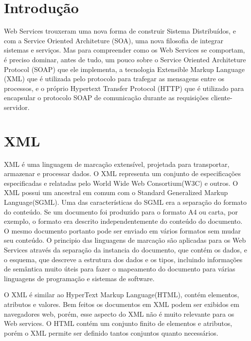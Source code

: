 \documentclass{acm_proc_article-sp}
\begin{document}



\section{Introdução}
		Web Services trouxeram uma nova forma de construir Sistema Distribuídos, e com a Service Oriented Architeture (SOA), uma nova filosofia de integrar sistemas e serviços. Mas para compreender como os Web Services se comportam, é preciso dominar, antes de tudo, um pouco sobre o Service Oriented Architeture Protocol (SOAP) que ele implementa, a tecnologia Extensible Markup Language (XML) que é utilizada pelo protocolo para trafegar as mensagens entre os processos, e o próprio Hypertext Transfer Protocol (HTTP) que é utilizado para encapsular o protocolo SOAP de comunicação durante as requisições cliente-servidor.
		
		
\section{XML}
		XML é uma linguagem de marcação extensível, projetada para transportar, armazenar e processar dados. O XML representa um conjunto de especificações especificadas e relatadas pelo World Wide Web Consortium(W3C) e outros. O XML possui um ancestral em comum com o Standard Generalized Markup Language(SGML). Uma das características do SGML era a separação do formato do conteúdo. Se um documento foi produzido para o formato A4 ou carta, por exemplo, o formato era descrito independentemente do conteúdo do documento. O mesmo documento portanto pode ser enviado em vários formatos sem mudar seu conteúdo. O principio das linguagens de marcação são aplicadas para os Web Services através da separação da instancia do documento, que contém os dados, e o esquema, que descreve a estrutura dos dados e os tipos, incluindo informações de semântica muito úteis para fazer o mapeamento do documento para várias linguagens de programação e sistemas de software.
		
		O XML é similar ao HyperText Markup Language(HTML), contém elementos, atributos e valores. Bem feitos os documentos em XML podem ser exibidos em navegadores web, porém, esse aspecto do XML não é muito relevante para os Web services. O HTML contém um conjunto finito de elementos e atributos, porém o XML permite ser definido tantos conjuntos quanto necessários.
		
\end{document}
